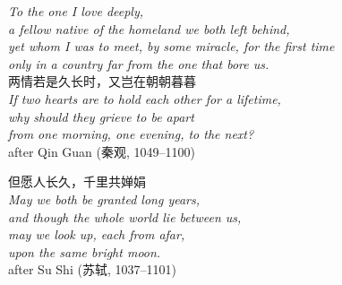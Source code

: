 \documentclass[11pt,a4paper]{article}
\begin{document}
\clearpage
\thispagestyle{empty}
\vspace*{0.20\textheight}
\begin{center}
{\itshape\color{ink}
To the one I love deeply,\\[0.4em]
a fellow native of the homeland we both left behind,\\[0.25em]
yet whom I was to meet, by some miracle, for the first time\\[0.25em]
only in a country far from the one that bore us.\\}
\vspace{2.6em}
{\cjkfont\large\color{rosedeep} 两情若是久长时，又岂在朝朝暮暮}\\[0.8em]
{\itshape\small\color{rosedeep}
If two hearts are to hold each other for a lifetime,\\[0.18em]
why should they grieve to be apart\\[0.18em]
from one morning, one evening, to the next?}\\[1.0em]
{\footnotesize\color{lightgold}after Qin Guan (\cjkfont 秦观\/{\normalfont,} 1049--1100)}
\vspace{2.4em}

{\cjkfont\large\color{rosedeep} 但愿人长久，千里共婵娟}\\[0.8em]
{\itshape\small\color{rosedeep}
May we both be granted long years,\\[0.18em]
and though the whole world lie between us,\\[0.18em]
may we look up, each from afar,\\[0.18em]
upon the same bright moon.}\\[1.0em]
{\footnotesize\color{lightgold}after Su Shi (\cjkfont 苏轼\/{\normalfont,} 1037--1101)}
\end{center}
\vfill
\clearpage
\end{document}
